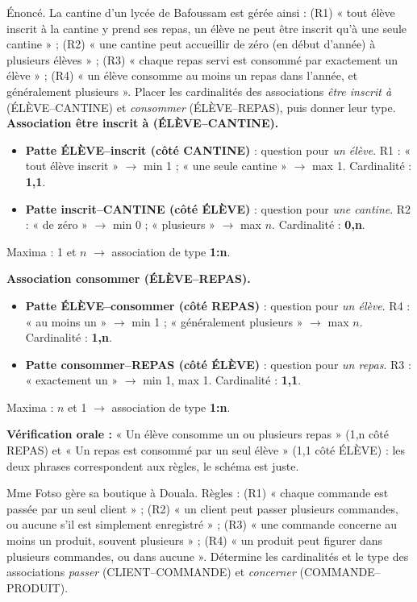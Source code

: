 \documentclass[11pt]{article}
\newcounter{popsec}
\newcounter{popsub}
\newcommand{\courssub}[1]{%
  \stepcounter{popsub}%
  \par\vspace{9pt}\noindent{\popxbold\fontsize{11.5}{13}\selectfont\color{popink}{\color{poporange}\thepopsec.\thepopsub}\hspace{6pt}#1}\par\nopagebreak\vspace{4pt}
}
\begin{document}
\courssub{Exercice résolu et entraînement}

\begin{exoresolu}
Énoncé. La cantine d'un lycée de Bafoussam est gérée ainsi : (R1) « tout élève inscrit à la cantine y prend ses repas, un élève ne peut être inscrit qu'à une seule cantine » ; (R2) « une cantine peut accueillir de zéro (en début d'année) à plusieurs élèves » ; (R3) « chaque repas servi est consommé par exactement un élève » ; (R4) « un élève consomme au moins un repas dans l'année, et généralement plusieurs ». Placer les cardinalités des associations \emph{être inscrit à} (ÉLÈVE--CANTINE) et \emph{consommer} (ÉLÈVE--REPAS), puis donner leur type.
\tcblower
\textbf{Association être inscrit à (ÉLÈVE--CANTINE).}
\begin{itemize}
\item \textbf{Patte ÉLÈVE--inscrit (côté CANTINE)} : question pour \emph{un élève}. R1 : « tout élève inscrit » $\rightarrow$ min 1 ; « une seule cantine » $\rightarrow$ max 1. Cardinalité : \textbf{1,1}.
\item \textbf{Patte inscrit--CANTINE (côté ÉLÈVE)} : question pour \emph{une cantine}. R2 : « de zéro » $\rightarrow$ min 0 ; « plusieurs » $\rightarrow$ max $n$. Cardinalité : \textbf{0,n}.
\end{itemize}
Maxima : 1 et $n$ $\rightarrow$ association de type \textbf{1:n}.

\textbf{Association consommer (ÉLÈVE--REPAS).}
\begin{itemize}
\item \textbf{Patte ÉLÈVE--consommer (côté REPAS)} : question pour \emph{un élève}. R4 : « au moins un » $\rightarrow$ min 1 ; « généralement plusieurs » $\rightarrow$ max $n$. Cardinalité : \textbf{1,n}.
\item \textbf{Patte consommer--REPAS (côté ÉLÈVE)} : question pour \emph{un repas}. R3 : « exactement un » $\rightarrow$ min 1, max 1. Cardinalité : \textbf{1,1}.
\end{itemize}
Maxima : $n$ et 1 $\rightarrow$ association de type \textbf{1:n}.

\textbf{Vérification orale :} « Un élève consomme un ou plusieurs repas » (1,n côté REPAS) et « Un repas est consommé par un seul élève » (1,1 côté ÉLÈVE) : les deux phrases correspondent aux règles, le schéma est juste.
\end{exoresolu}

\begin{exercice}
Mme Fotso gère sa boutique à Douala. Règles : (R1) « chaque commande est passée par un seul client » ; (R2) « un client peut passer plusieurs commandes, ou aucune s'il est simplement enregistré » ; (R3) « une commande concerne au moins un produit, souvent plusieurs » ; (R4) « un produit peut figurer dans plusieurs commandes, ou dans aucune ». Détermine les cardinalités et le type des associations \emph{passer} (CLIENT--COMMANDE) et \emph{concerner} (COMMANDE--PRODUIT).
\end{exercice}
\end{document}
